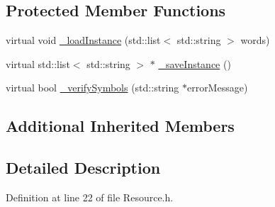 \subsection*{Protected Member Functions}
\begin{DoxyCompactItemize}
\item 
virtual void \hyperlink{class_resource_a5c4aedea65e6800cf44fb3620d559148}{\-\_\-load\-Instance} (std\-::list$<$ std\-::string $>$ words)
\item 
virtual std\-::list$<$ std\-::string $>$ $\ast$ \hyperlink{class_resource_a546f61a6f5f57f0c41c722b9b9dc7478}{\-\_\-save\-Instance} ()
\item 
virtual bool \hyperlink{class_resource_a3b282a34c4c706ca63716cb74e7f8183}{\-\_\-verify\-Symbols} (std\-::string $\ast$error\-Message)
\end{DoxyCompactItemize}
\subsection*{Additional Inherited Members}


\subsection{Detailed Description}


Definition at line 22 of file Resource.\-h.



